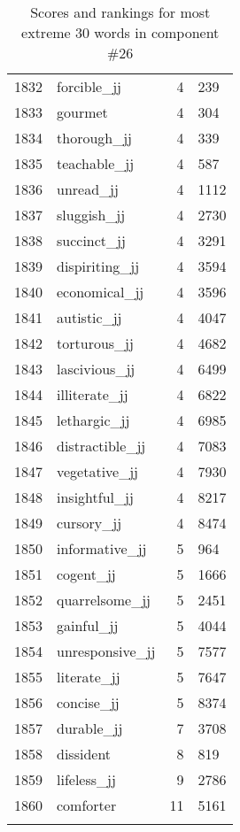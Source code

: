 \begin{longtable}[!htbp]{| rlr@{.}l |}
    1832 & forcible\_jj & 4 & 239 \\
    1833 & gourmet & 4 & 304 \\
    1834 & thorough\_jj & 4 & 339 \\
    1835 & teachable\_jj & 4 & 587 \\
    1836 & unread\_jj & 4 & 1112 \\
    1837 & sluggish\_jj & 4 & 2730 \\
    1838 & succinct\_jj & 4 & 3291 \\
    1839 & dispiriting\_jj & 4 & 3594 \\
    1840 & economical\_jj & 4 & 3596 \\
    1841 & autistic\_jj & 4 & 4047 \\
    1842 & torturous\_jj & 4 & 4682 \\
    1843 & lascivious\_jj & 4 & 6499 \\
    1844 & illiterate\_jj & 4 & 6822 \\
    1845 & lethargic\_jj & 4 & 6985 \\
    1846 & distractible\_jj & 4 & 7083 \\
    1847 & vegetative\_jj & 4 & 7930 \\
    1848 & insightful\_jj & 4 & 8217 \\
    1849 & cursory\_jj & 4 & 8474 \\
    1850 & informative\_jj & 5 & 964 \\
    1851 & cogent\_jj & 5 & 1666 \\
    1852 & quarrelsome\_jj & 5 & 2451 \\
    1853 & gainful\_jj & 5 & 4044 \\
    1854 & unresponsive\_jj & 5 & 7577 \\
    1855 & literate\_jj & 5 & 7647 \\
    1856 & concise\_jj & 5 & 8374 \\
    1857 & durable\_jj & 7 & 3708 \\
    1858 & dissident & 8 & 819 \\
    1859 & lifeless\_jj & 9 & 2786 \\
    1860 & comforter & 11 & 5161 \\
    \hline
    \caption{Scores and rankings for most extreme 30 words in component \#26} \\
\end{longtable}
